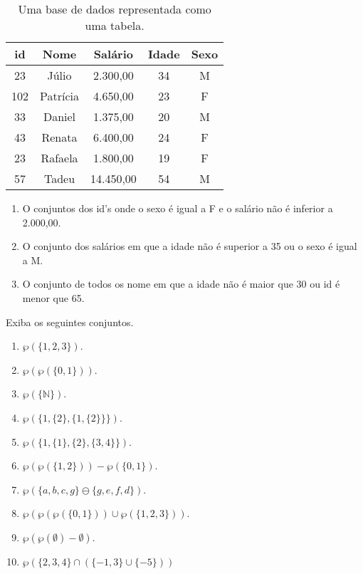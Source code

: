 \begin{table}[h]
	\centering
	\scriptsize
	\begin{tabular}{ccccc}
		\hline
		id & Nome & Salário & Idade & Sexo \\
		\hline
		23 & Júlio & 2.300,00 & 34 & M \\
		102 & Patrícia & 4.650,00 & 23 & F \\
		33 & Daniel & 1.375,00 & 20 & M \\
		43 & Renata & 6.400,00 & 24 & F \\
		23 & Rafaela & 1.800,00 & 19 & F \\
		57 & Tadeu & 14.450,00 & 54 & M \\
		\hline
	\end{tabular}
	\caption{Uma base de dados representada como uma tabela.}
	\label{tab:TabelaBaseDeDados1}
\end{table}

\begin{enumerate}
	\item O conjuntos dos id's onde o sexo é igual a F e o salário não é inferior a 2.000,00.
	\item O conjunto dos salários em que a idade não é superior a 35 ou o sexo é igual a M.
	\item O conjunto de todos os nome em que a idade não é maior que 30 ou id é menor que 65.
\end{enumerate}

\begin{exercise}\label{exerc:Conjuntos12}
	Exiba os seguintes conjuntos.
\end{exercise}

\begin{enumerate}
	\item $\wp(\{1, 2, 3\})$.
	\item $\wp(\wp(\{0,1\}))$.
	\item $\wp(\{\mathbb{N}\})$.
	\item $\wp(\{1, \{2\}, \{1, \{2\}\}\})$.
	\item $\wp(\{1, \{1\}, \{2\}, \{3, 4\}\})$.
	\item $\wp(\wp(\{1, 2\})) - \wp(\{0, 1\})$.
	\item $\wp(\{a, b, c, g\} \ominus \{g, e, f, d\})$.
	\item $\wp(\wp(\wp(\{0,1\})) \cup \wp(\{1, 2, 3\}))$.
	\item $\wp(\wp(\emptyset) - \emptyset)$.
	\item $\wp(\{2, 3, 4\} \cap (\{-1, 3\} \cup \{-5\}))$
\end{enumerate}

